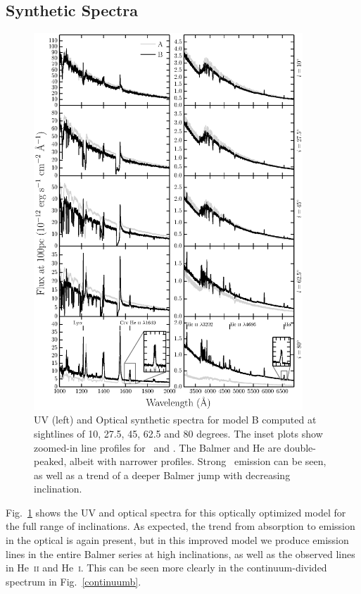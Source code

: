 \documentclass[preprint, a4paper, 11pt]{aastex}
\begin{document}
\subsection{Synthetic Spectra}

\begin{figure} %
\includegraphics[width=0.9\textwidth]{figures/modelb_uv_opt.eps}
\caption{
UV (left) and Optical synthetic spectra for model B computed at
sightlines of 10, 27.5, 45, 62.5 and 80 degrees.	
The inset plots show zoomed-in line profiles for 
\heiiuv\ and \ha. The Balmer and He
are double-peaked, albeit with narrower profiles.
Strong \heiiopt\ emission can be seen, as well as a trend
of a deeper Balmer jump with decreasing inclination.
}
\label{uvoptb}
\end{figure} %

Fig.~\ref{uvoptb} shows the UV and optical spectra for this
optically optimized model for the full range of inclinations. 
As expected, the trend from absorption to emission 
in the optical is again present, but in this improved model we produce emission
lines in the entire Balmer series at high inclinations, as well as the observed lines 
in He~\textsc{ii} and He~\textsc{i}. This can be seen more clearly in the 
continuum-divided spectrum in Fig.~\ref{continuumb}.
\end{document}

